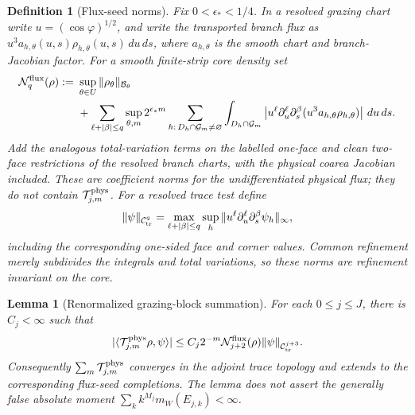 \documentclass[11pt]{amsart}
\theoremstyle{compactplain}
\newtheorem{lemma}[theorem]{Lemma}
\theoremstyle{compactdefinition}
\newtheorem{definition}[theorem]{Definition}
\theoremstyle{compactremark}
\newcommand{\Bcal}{\mathcal B}
\begin{document}
\begin{definition}[Flux-seed norms]
\label{def:flux_seed_norms}
Fix \(0<\epsilon_*<1/4\).  In a resolved grazing chart write
\(u=(\cos\varphi)^{1/2}\), and write the transported branch flux as
\(u^3a_{h,\theta}(u,s)\rho_{h,\theta}(u,s)\,du\,ds\), where \(a_{h,\theta}\)
is the smooth chart and branch-Jacobian factor.  For a smooth finite-strip
core density set
\begin{align}
 \mathcal N_q^{\rm flux}(\rho)
  :=\ &\sup_{\theta\in U}\|\rho_\theta\|_{\Bcal_\theta}\notag\\
 &+\sum_{\ell+|\beta|\le q}
   \sup_{\theta,m}2^{\epsilon_*m}
   \sum_{h:\,D_h\cap\mathcal G_m\ne\varnothing}
   \int_{D_h\cap\mathcal G_m}
   \left|u^\ell\partial_u^\ell\partial_s^\beta
   (u^3a_{h,\theta}\rho_{h,\theta})\right|\,du\,ds .
\end{align}
Add the analogous total-variation terms on the labelled one-face and clean
two-face restrictions of the resolved branch charts, with the physical coarea
Jacobian included.  These are coefficient norms for the undifferentiated
physical flux; they do not contain
\(\mathcal T_{j,m}^{\rm phys}\).  For a resolved trace test define
\[
  \|\psi\|_{\mathcal C_{\rm tr}^{q}}
  =\max_{\ell+|\beta|\le q}
   \sup_h\|u^\ell\partial_u^\ell\partial_s^\beta\psi_h\|_\infty,
\]
including the corresponding one-sided face and corner values.  Common
refinement merely subdivides the integrals and total variations, so these
norms are refinement invariant on the core.
\end{definition}

\begin{lemma}[Renormalized grazing-block summation]
\label{lem:renormalized_grazing_block_sum}
For each \(0\le j\le J\), there is \(C_j<\infty\) such that
\begin{equation}
\label{eq:renormalized_grazing_block_bound}
  |\langle\mathcal T_{j,m}^{\rm phys}\rho,\psi\rangle|
  \le
  C_j2^{-m}
  \mathcal N_{j+2}^{\rm flux}(\rho)
  \|\psi\|_{\mathcal C_{\rm tr}^{j+3}} .
\end{equation}
Consequently \(\sum_m\mathcal T_{j,m}^{\rm phys}\) converges in the adjoint
trace topology and extends to the corresponding flux-seed completions.  The
lemma does not assert the generally false absolute
moment \(\sum_k k^{M_j}m_W(E_{j,k})<\infty\).
\end{lemma}
\end{document}
